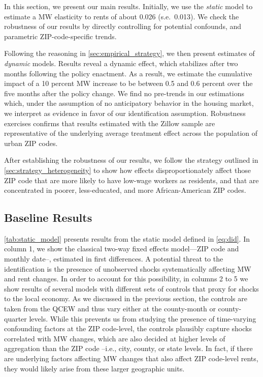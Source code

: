 
In this section, we present our main results. Initially, we use the \textit{static} model
to estimate a MW elasticity to rents of about 0.026 (s.e.\ 0.013). We check the 
robustness of our results by directly controlling for potential confounds, and parametric 
ZIP-code-specific trends.

Following the reasoning in \autoref{sec:empirical_strategy}, we then present estimates of 
\textit{dynamic} models. Results reveal a dynamic effect, which stabilizes after two
months following the policy enactment. As a result, we estimate the cumulative impact of 
a 10 percent MW increase to be between 0.5 and 0.6 percent over the five months after the 
policy change.
We find no pre-trends in our estimations which, under the assumption of no anticipatory 
behavior in the housing market, we interpret as evidence in favor of our identification
assumption. Robustness exercises confirms that results estimated with the Zillow sample 
are representative of the underlying average treatment effect across the population of 
urban ZIP codes.

After establishing the robustness of our results, we follow the strategy outlined in 
\autoref{sec:strategy_heterogeneity} to show how effects disproportionately affect those 
ZIP code that are more likely to have low-wage workers as residents, and that are 
concentrated in poorer, less-educated, and more African-American ZIP codes. 

\subsection{Baseline Results}\label{sec:baseline_results}

\autoref{tab:static_model} presents results from the static model defined in \autoref{eq:did}. 
In column 1, we show the classical two-way fixed effects model---ZIP code and monthly date--, 
estimated in first differences. A potential threat to the identification is the presence of 
unobserved shocks systematically affecting MW and rent changes. In order to account for this 
possibility, in columns 2 to 5 we show results of several models with different sets of 
controls that proxy for shocks to the local economy. As we discussed in the previous section, 
the controls are taken from the QCEW and thus vary either at the county-month or 
county-quarter levels. While this prevents us from studying the presence of time-varying 
confounding factors at the ZIP code-level, the controls plausibly capture shocks correlated 
with MW changes, which are also decided at higher levels of aggregation than the ZIP code 
--i.e., city, county, or state levels. In fact, if there are underlying factors affecting MW 
changes that also affect ZIP code-level rents, they would likely arise from these larger 
geographic units. 

